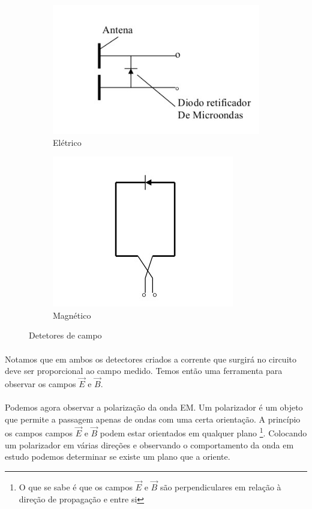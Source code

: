 \documentclass[a4paper,11pt]{article}
\begin{document}
\FloatBarrier
\begin{figure}[!htp]
			\centering
			\begin{subfigure}[b]{0.3\textwidth}
					\centering					
					\includegraphics[scale=0.6]{detetor-E.jpg}
					\caption{Elétrico}
					\label{detetor-E}
			\end{subfigure}
			\qquad
			\begin{subfigure}[b]{0.3\textwidth}
					\centering
					\includegraphics[scale=0.6]{detetor-B.jpg}
					\caption{Magnético}
					\label{detetor-B}
			\end{subfigure}
			
	\caption{Detetores de campo}
	\end{figure}
\FloatBarrier

	\paragraph{}  Notamos que em ambos os detectores criados a corrente que surgirá no circuito deve ser proporcional ao campo medido. Temos então uma ferramenta para observar os campos $ \vec{E} $ e $ \vec{B} $. 
	
	\paragraph{} Podemos agora observar a polarização da onda EM. Um polarizador é um objeto que permite a passagem apenas de ondas com uma certa orientação. A princípio os campos campos $ \vec{E} $ e $ \vec{B} $ podem estar orientados em qualquer plano \footnote{O que se sabe é que os campos $\vec{E} $ e $ \vec{B}$ são perpendiculares em relação à direção de propagação e entre si}. Colocando um polarizador em várias direções e observando o comportamento da onda em estudo podemos determinar se existe um plano que a oriente.
	
\end{document}
